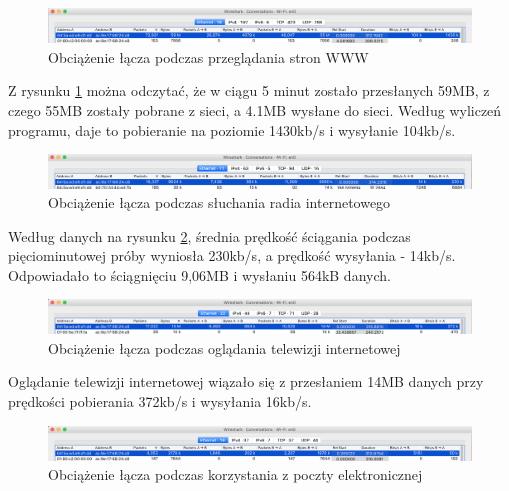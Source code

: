 \documentclass[12pt,a4paper,titlepage]{article}
\begin{document}
\vspace{1cm}

\begin{figure}[H]
  \centering
    \includegraphics[width=14cm]{www-short.png}
    \caption{Obciążenie łącza podczas przeglądania stron WWW}
    \label{fig:www}
\end{figure}

Z rysunku \ref{fig:www} można odczytać, że w ciągu 5 minut zostało przesłanych 59MB, z czego 55MB zostały pobrane z sieci, a 4.1MB wysłane do sieci. Według wyliczeń programu, daje to pobieranie na poziomie 1430kb/s i wysyłanie 104kb/s.

\vspace{1cm}
\begin{figure}[H]
  \centering
    \includegraphics[width=14cm]{radio-short.png}
    \caption{Obciążenie łącza podczas słuchania radia internetowego}
    \label{fig:radio}
\end{figure}

Według danych na rysunku \ref{fig:radio}, średnia prędkość ściągania podczas pięciominutowej próby wyniosła 230kb/s, a prędkość wysyłania - 14kb/s. Odpowiadało to ściągnięciu 9,06MB i wysłaniu 564kB danych.

\vspace{1cm}
\begin{figure}[H]
  \centering
    \includegraphics[width=14cm]{tv-short.png}
    \caption{Obciążenie łącza podczas oglądania telewizji internetowej}
    \label{fig:tv}
\end{figure}

Oglądanie telewizji internetowej wiązało się z przesłaniem 14MB danych przy prędkości pobierania 372kb/s i wysyłania 16kb/s.

\vspace{1cm}
\begin{figure}[H]
  \centering
    \includegraphics[width=14cm]{poczta-short.png}
    \caption{Obciążenie łącza podczas korzystania z poczty elektronicznej}
    \label{fig:poczta}
\end{figure}
\end{document}
